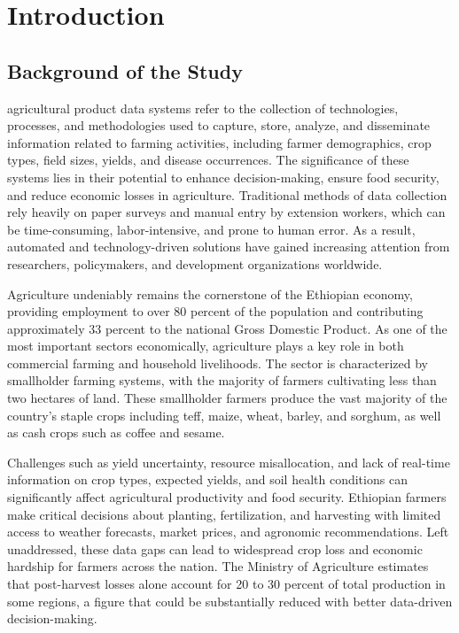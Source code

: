 
\chapter{Introduction}

\section{Background of the Study}

agricultural product data systems refer to the collection of technologies, processes, and methodologies used to capture, store, analyze, and disseminate information related to farming activities, including farmer demographics, crop types, field sizes, yields, and disease occurrences. The significance of these systems lies in their potential to enhance decision-making, ensure food security, and reduce economic losses in agriculture. Traditional methods of data collection rely heavily on paper surveys and manual entry by extension workers, which can be time-consuming, labor-intensive, and prone to human error. As a result, automated and technology-driven solutions have gained increasing attention from researchers, policymakers, and development organizations worldwide.

Agriculture undeniably remains the cornerstone of the Ethiopian economy, providing employment to over 80 percent of the population and contributing approximately 33 percent to the national Gross Domestic Product. As one of the most important sectors economically, agriculture plays a key role in both commercial farming and household livelihoods. The sector is characterized by smallholder farming systems, with the majority of farmers cultivating less than two hectares of land. These smallholder farmers produce the vast majority of the country's staple crops including teff, maize, wheat, barley, and sorghum, as well as cash crops such as coffee and sesame.

Challenges such as yield uncertainty, resource misallocation, and lack of real-time information on crop types, expected yields, and soil health conditions can significantly affect agricultural productivity and food security. Ethiopian farmers make critical decisions about planting, fertilization, and harvesting with limited access to weather forecasts, market prices, and agronomic recommendations. Left unaddressed, these data gaps can lead to widespread crop loss and economic hardship for farmers across the nation. The Ministry of Agriculture estimates that post-harvest losses alone account for 20 to 30 percent of total production in some regions, a figure that could be substantially reduced with better data-driven decision-making.

